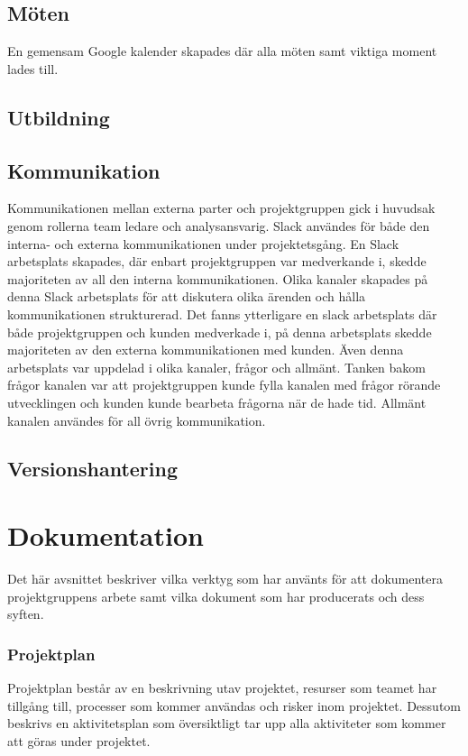 \subsection{Möten}
En gemensam Google kalender skapades där alla möten samt viktiga moment lades till.

\subsection{Utbildning}

\subsection{Kommunikation}
Kommunikationen mellan externa parter och projektgruppen gick i huvudsak genom rollerna team ledare och analysansvarig. Slack användes för både den interna- och externa kommunikationen under projektetsgång. En Slack arbetsplats skapades, där enbart projektgruppen var medverkande i, skedde majoriteten av all den interna kommunikationen. Olika kanaler skapades på denna Slack arbetsplats för att diskutera olika ärenden och hålla kommunikationen strukturerad. Det fanns ytterligare en slack arbetsplats där både projektgruppen och kunden medverkade i, på denna arbetsplats skedde majoriteten av den externa kommunikationen med kunden. Även denna arbetsplats var uppdelad i olika kanaler, frågor och allmänt. Tanken bakom frågor kanalen var att projektgruppen kunde fylla kanalen med frågor rörande utvecklingen och kunden kunde bearbeta frågorna när de hade tid. Allmänt kanalen användes för all övrig kommunikation.

\subsection{Versionshantering}

\section{Dokumentation}
Det här avsnittet beskriver vilka verktyg som har använts för att dokumentera projektgruppens arbete samt vilka dokument som har producerats och dess syften.

\subsubsection*{Projektplan}
Projektplan består av en beskrivning utav projektet, 
resurser som teamet har tillgång till, processer som kommer användas och risker inom projektet.
Dessutom beskrivs en aktivitetsplan som översiktligt tar upp alla aktiviteter som kommer att
göras under projektet.

